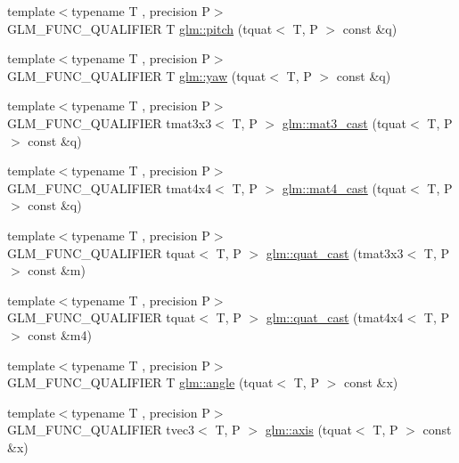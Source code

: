 \begin{DoxyCompactItemize}
{\footnotesize template$<$typename T , precision P$>$ }\\G\+L\+M\+\_\+\+F\+U\+N\+C\+\_\+\+Q\+U\+A\+L\+I\+F\+I\+ER T \hyperlink{group__gtc__quaternion_ga2c08b93a4261c10748fd4d2104346f17}{glm\+::pitch} (tquat$<$ T, P $>$ const \&q)
\item 
{\footnotesize template$<$typename T , precision P$>$ }\\G\+L\+M\+\_\+\+F\+U\+N\+C\+\_\+\+Q\+U\+A\+L\+I\+F\+I\+ER T \hyperlink{group__gtc__quaternion_ga724a5df282b70cec0a6cb0d6dcddb6d6}{glm\+::yaw} (tquat$<$ T, P $>$ const \&q)
\item 
{\footnotesize template$<$typename T , precision P$>$ }\\G\+L\+M\+\_\+\+F\+U\+N\+C\+\_\+\+Q\+U\+A\+L\+I\+F\+I\+ER tmat3x3$<$ T, P $>$ \hyperlink{group__gtc__quaternion_gae04c39422eb4e450ec8c4f45a1057b40}{glm\+::mat3\+\_\+cast} (tquat$<$ T, P $>$ const \&q)
\item 
{\footnotesize template$<$typename T , precision P$>$ }\\G\+L\+M\+\_\+\+F\+U\+N\+C\+\_\+\+Q\+U\+A\+L\+I\+F\+I\+ER tmat4x4$<$ T, P $>$ \hyperlink{group__gtc__quaternion_ga14bb2ddf028c91542763eb6f2bba47ef}{glm\+::mat4\+\_\+cast} (tquat$<$ T, P $>$ const \&q)
\item 
{\footnotesize template$<$typename T , precision P$>$ }\\G\+L\+M\+\_\+\+F\+U\+N\+C\+\_\+\+Q\+U\+A\+L\+I\+F\+I\+ER tquat$<$ T, P $>$ \hyperlink{group__gtc__quaternion_ga950f8acff3e33bbda77895a3dcb7e5ce}{glm\+::quat\+\_\+cast} (tmat3x3$<$ T, P $>$ const \&m)
\item 
{\footnotesize template$<$typename T , precision P$>$ }\\G\+L\+M\+\_\+\+F\+U\+N\+C\+\_\+\+Q\+U\+A\+L\+I\+F\+I\+ER tquat$<$ T, P $>$ \hyperlink{group__gtc__quaternion_ga3e4615e9884dd0f41f5617b9848a5d9c}{glm\+::quat\+\_\+cast} (tmat4x4$<$ T, P $>$ const \&m4)
\item 
{\footnotesize template$<$typename T , precision P$>$ }\\G\+L\+M\+\_\+\+F\+U\+N\+C\+\_\+\+Q\+U\+A\+L\+I\+F\+I\+ER T \hyperlink{group__gtc__quaternion_gad4a4448baedb198b2b1e7880d2544dc9}{glm\+::angle} (tquat$<$ T, P $>$ const \&x)
\item 
{\footnotesize template$<$typename T , precision P$>$ }\\G\+L\+M\+\_\+\+F\+U\+N\+C\+\_\+\+Q\+U\+A\+L\+I\+F\+I\+ER tvec3$<$ T, P $>$ \hyperlink{group__gtc__quaternion_ga0b3e87a13b2708154b72259e50789a19}{glm\+::axis} (tquat$<$ T, P $>$ const \&x)

\end{DoxyCompactItemize}
